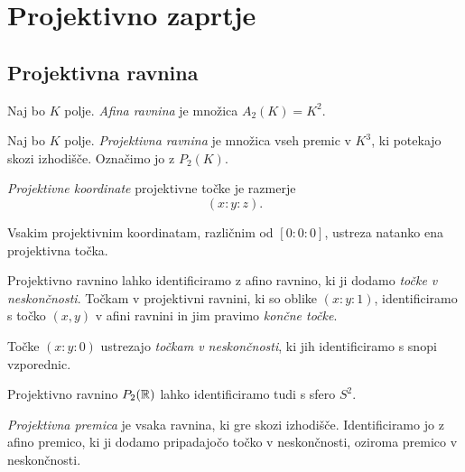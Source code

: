 \section{Projektivno zaprtje}

\subsection{Projektivna ravnina}


\begin{definicija}
Naj bo $K$ polje. \emph{Afina ravnina} je
množica $A_2(K) = K^2$.
\end{definicija}

\begin{definicija}
Naj bo $K$ polje.
\emph{Projektivna ravnina} je množica
vseh premic v $K^3$, ki potekajo skozi izhodišče. Označimo jo z
$P_2(K)$.
\end{definicija}

\begin{definicija}
\emph{Projektivne koordinate}
projektivne točke je razmerje
\[
(x : y : z).
\]
\end{definicija}

\begin{opomba}
Vsakim projektivnim koordinatam, različnim od $[0 : 0 : 0]$, ustreza
natanko ena projektivna točka.
\end{opomba}

\begin{opomba}
Projektivno ravnino lahko identificiramo z afino ravnino, ki ji
dodamo \emph{točke v neskončnosti}. Točkam v projektivni ravnini,
ki so oblike $(x : y : 1)$, identificiramo s točko $(x, y)$ v afini
ravnini in jim pravimo \emph{končne točke}.

Točke $(x : y : 0)$ ustrezajo \emph{točkam v neskončnosti}, ki jih
identificiramo s snopi vzporednic.
\end{opomba}

\begin{opomba}
Projektivno ravnino $P_2(\mathbb{R})$ lahko identificiramo tudi s sfero
$S^2$.
\end{opomba}

\begin{definicija}
\emph{Projektivna premica} je
vsaka ravnina, ki gre skozi izhodišče. Identificiramo jo z afino
premico, ki ji dodamo pripadajočo točko v neskončnosti, oziroma
premico v neskončnosti.
\end{definicija}

